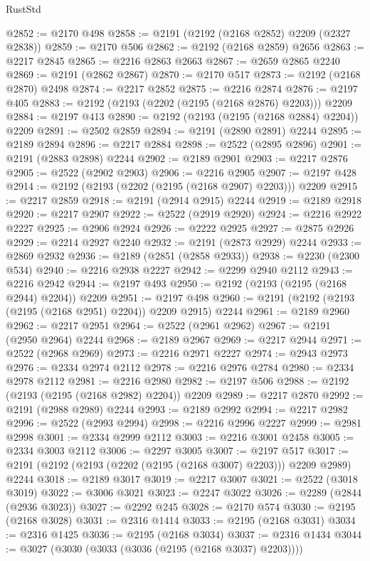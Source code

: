 \begin{lexlean}{RustStd}
\begin{coremodule}
@2852 := @2170 @498
@2858 := @2191 (@2192 (@2168 @2852) @2209 (@2327 @2838))
@2859 := @2170 @506
@2862 := @2192 (@2168 @2859) @2656
@2863 := @2217 @2845
@2865 := @2216 @2863 @2663
@2867 := @2659 @2865 @2240
@2869 := @2191 (@2862 @2867)
@2870 := @2170 @517
@2873 := @2192 (@2168 @2870) @2498
@2874 := @2217 @2852
@2875 := @2216 @2874
@2876 := @2197 @405
@2883 := @2192 (@2193 (@2202 (@2195 (@2168 @2876) @2203))) @2209
@2884 := @2197 @413
@2890 := @2192 (@2193 (@2195 (@2168 @2884) @2204)) @2209
@2891 := @2502 @2859
@2894 := @2191 (@2890 @2891) @2244
@2895 := @2189 @2894
@2896 := @2217 @2884
@2898 := @2522 (@2895 @2896)
@2901 := @2191 (@2883 @2898) @2244
@2902 := @2189 @2901
@2903 := @2217 @2876
@2905 := @2522 (@2902 @2903)
@2906 := @2216 @2905
@2907 := @2197 @428
@2914 := @2192 (@2193 (@2202 (@2195 (@2168 @2907) @2203))) @2209
@2915 := @2217 @2859
@2918 := @2191 (@2914 @2915) @2244
@2919 := @2189 @2918
@2920 := @2217 @2907
@2922 := @2522 (@2919 @2920)
@2924 := @2216 @2922 @2227
@2925 := @2906 @2924
@2926 := @2222 @2925
@2927 := @2875 @2926
@2929 := @2214 @2927 @2240
@2932 := @2191 (@2873 @2929) @2244
@2933 := @2869 @2932
@2936 := @2189 (@2851 (@2858 @2933))
@2938 := @2230 (@2300 @534)
@2940 := @2216 @2938 @2227
@2942 := @2299 @2940 @2112
@2943 := @2216 @2942
@2944 := @2197 @493
@2950 := @2192 (@2193 (@2195 (@2168 @2944) @2204)) @2209
@2951 := @2197 @498
@2960 := @2191 (@2192 (@2193 (@2195 (@2168 @2951) @2204)) @2209 @2915) @2244
@2961 := @2189 @2960
@2962 := @2217 @2951
@2964 := @2522 (@2961 @2962)
@2967 := @2191 (@2950 @2964) @2244
@2968 := @2189 @2967
@2969 := @2217 @2944
@2971 := @2522 (@2968 @2969)
@2973 := @2216 @2971 @2227
@2974 := @2943 @2973
@2976 := @2334 @2974 @2112
@2978 := @2216 @2976 @2784
@2980 := @2334 @2978 @2112
@2981 := @2216 @2980
@2982 := @2197 @506
@2988 := @2192 (@2193 (@2195 (@2168 @2982) @2204)) @2209
@2989 := @2217 @2870
@2992 := @2191 (@2988 @2989) @2244
@2993 := @2189 @2992
@2994 := @2217 @2982
@2996 := @2522 (@2993 @2994)
@2998 := @2216 @2996 @2227
@2999 := @2981 @2998
@3001 := @2334 @2999 @2112
@3003 := @2216 @3001 @2458
@3005 := @2334 @3003 @2112
@3006 := @2297 @3005
@3007 := @2197 @517
@3017 := @2191 (@2192 (@2193 (@2202 (@2195 (@2168 @3007) @2203))) @2209 @2989) @2244
@3018 := @2189 @3017
@3019 := @2217 @3007
@3021 := @2522 (@3018 @3019)
@3022 := @3006 @3021
@3023 := @2247 @3022
@3026 := @2289 (@2844 (@2936 @3023))
@3027 := @2292 @245
@3028 := @2170 @574
@3030 := @2195 (@2168 @3028)
@3031 := @2316 @1414
@3033 := @2195 (@2168 @3031)
@3034 := @2316 @1425
@3036 := @2195 (@2168 @3034)
@3037 := @2316 @1434
@3044 := @3027 (@3030 (@3033 (@3036 (@2195 (@2168 @3037) @2203))))

\end{coremodule}
\end{lexlean}

